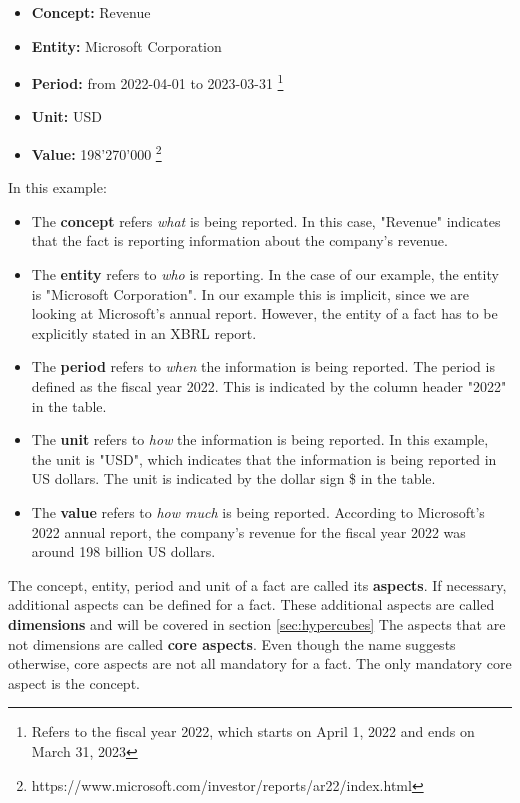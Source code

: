 \begin{itemize}
    \item \textbf{Concept:} Revenue
    \item \textbf{Entity:} Microsoft Corporation
    \item \textbf{Period:} from 2022-04-01 to 2023-03-31 \footnote{Refers to the fiscal year 2022, which starts on April 1, 2022 and ends on March 31, 2023}
    \item \textbf{Unit:} USD
    \item \textbf{Value:} 198'270'000 \footnote{https://www.microsoft.com/investor/reports/ar22/index.html}
\end{itemize}

In this example:

\begin{itemize}
    \item The \textbf{concept} refers \textit{what} is being reported. 
    In this case, "Revenue" indicates that the fact is reporting information about the company's revenue.
    \item The \textbf{entity} refers to \textit{who} is reporting. 
    In the case of our example, the entity is "Microsoft Corporation". 
    In our example this is implicit, since we are looking at Microsoft's annual report.
    However, the entity of a fact has to be explicitly stated in an XBRL report.
    \item The \textbf{period} refers to \textit{when} the information is being reported.
    The period is defined as the fiscal year 2022.
    This is indicated by the column header "2022" in the table.
    \item The \textbf{unit} refers to \textit{how} the information is being reported.
    In this example, the unit is "USD", which indicates that the information is being reported in US dollars.
    The unit is indicated by the dollar sign \$ in the table.
    \item The \textbf{value} refers to \textit{how much} is being reported.
    According to Microsoft's 2022 annual report, the company's revenue for the fiscal year 2022 was around 198 billion US dollars.
\end{itemize}

The concept, entity, period and unit of a fact are called its \textbf{aspects}. 
If necessary, additional aspects can be defined for a fact. 
These additional aspects are called \textbf{dimensions} and will be covered in section \ref{sec:hypercubes}
The aspects that are not dimensions are called \textbf{core aspects}. 
Even though the name suggests otherwise, core aspects are not all mandatory for a fact.
The only mandatory core aspect is the concept.